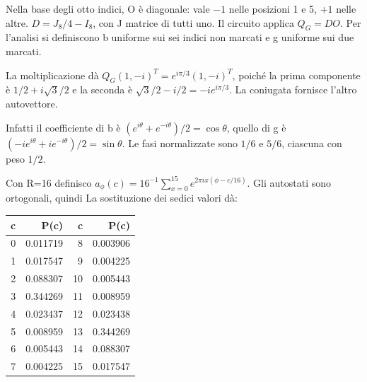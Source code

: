 
Nella base degli otto indici, O è diagonale: vale \(-1\) nelle posizioni 1 e 5, \(+1\) nelle altre. \(D=J_8/4-I_8\), con J matrice di tutti uno. Il circuito applica \(Q_G=DO\). Per l’analisi si definiscono b uniforme sui sei indici non marcati e g uniforme sui due marcati.


La moltiplicazione dà \(Q_G(1,-i)^T=e^{i\pi/3}(1,-i)^T\), poiché la prima componente è \(1/2+i\sqrt3/2\) e la seconda è \(\sqrt3/2-i/2=-i e^{i\pi/3}\). La coniugata fornisce l’altro autovettore.


Infatti il coefficiente di b è \((e^{i\theta}+e^{-i\theta})/2=\cos\theta\), quello di g è \((-ie^{i\theta}+ie^{-i\theta})/2=\sin\theta\). Le fasi normalizzate sono \(1/6\) e \(5/6\), ciascuna con peso \(1/2\).


Con R=16 definisco \(a_\phi(c)=16^{-1}\sum_{x=0}^{15}e^{2\pi ix(\phi-c/16)}\). Gli autostati sono ortogonali, quindi
La sostituzione dei sedici valori dà:\begin{center}\begin{tabular}{rrrr}\toprule c&P(c)&c&P(c)\\\midrule
0&0.011719&8&0.003906\\
1&0.017547&9&0.004225\\
2&0.088307&10&0.005443\\
3&0.344269&11&0.008959\\
4&0.023437&12&0.023438\\
5&0.008959&13&0.344269\\
6&0.005443&14&0.088307\\
7&0.004225&15&0.017547\\
\bottomrule\end{tabular}\end{center}

